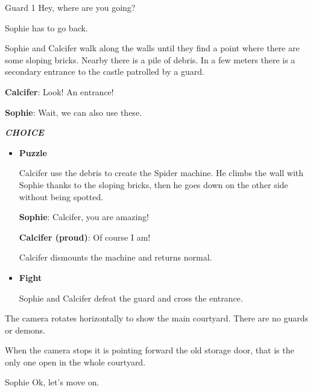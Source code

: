 \begin{screenplay}

\begin{dialogue}{Guard 1}
Hey, where are you going?
\end{dialogue}

Sophie has to go back.

\end{screenplay}
\vspace{1em}


Sophie and Calcifer walk along the walls until they find a point where there are some sloping bricks. Nearby there is a pile of debris.
In a few meters there is a secondary entrance to the castle patrolled by a guard.

\textbf{Calcifer}: Look! An entrance!

\textbf{Sophie}: Wait, we can also use these.

\textit{\textbf{CHOICE}}
\begin{itemize}
  \item \textbf{Puzzle}
  
  Calcifer use the debris to create the Spider machine. He climbs the wall with Sophie thanks to the sloping bricks, then he goes down on the other side without being spotted.
  
  \textbf{Sophie}: Calcifer, you are amazing!
  
  \textbf{Calcifer (proud)}: Of course I am!

  Calcifer dismounts the machine and returns normal.

  \item \textbf{Fight}
    
  Sophie and Calcifer defeat the guard and cross the entrance.
\end{itemize}


\begin{screenplay}

The camera rotates horizontally to show the main courtyard. There are no guards or demons.

When the camera stops it is pointing forward the old storage door, that is the only one open in the whole courtyard.

\begin{dialogue}{Sophie}
Ok, let's move on.
\end{dialogue}

\end{screenplay}
\vspace{1em}

